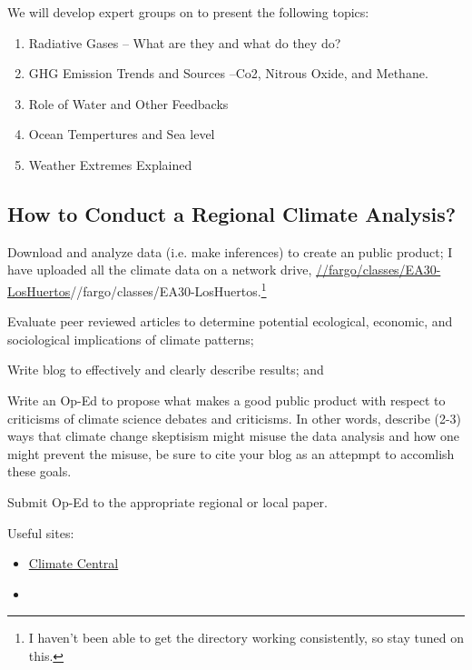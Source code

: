 \documentclass{article}\usepackage[]{graphicx}\usepackage[]{color}
\newenvironment{enumerate*}%
  {\begin{enumerate}%
    \setlength{\itemsep}{0pt}%
    \setlength{\parskip}{0pt}}%
  {\end{enumerate}}
\begin{document}
We will develop expert groups on to present the following topics:

\begin{enumerate}
  \item Radiative Gases -- What are they and what do they do?
  \item GHG Emission Trends and Sources --Co2, Nitrous Oxide, and Methane.
  \item Role of Water and Other Feedbacks
  \item Ocean Tempertures and Sea level
  \item Weather Extremes Explained
\end{enumerate}

\subsection{How to Conduct a Regional Climate Analysis?}

\begin{enumerate*}

  \item Download and analyze data (i.e. make inferences) to create an public product; I have uploaded all the climate data on a network drive, \url{//fargo/classes/EA30-LosHuertos}{//fargo/classes/EA30-LosHuertos}.\footnote{I haven't been able to get the directory working consistently, so stay tuned on this.}
  
  \item Evaluate peer reviewed articles to determine potential ecological, economic, and sociological implications of climate patterns; 
  \item Write blog to effectively and clearly describe results; and
  \item Write an Op-Ed to propose what makes a good public product with respect to criticisms of climate science debates and criticisms. In other words, describe (2-3) ways that climate change skeptisism might misuse the data analysis and how one might prevent the misuse, be sure to cite your blog as an attepmpt to accomlish these goals. 
  \item Submit Op-Ed to the appropriate regional or local paper.
\end{enumerate*}

Useful sites: 

\begin{itemize}
  \item \href{http://www.climatecentral.org/news/the-heat-is-on}{Climate Central}
  \item 
\end{itemize}
\end{document}
